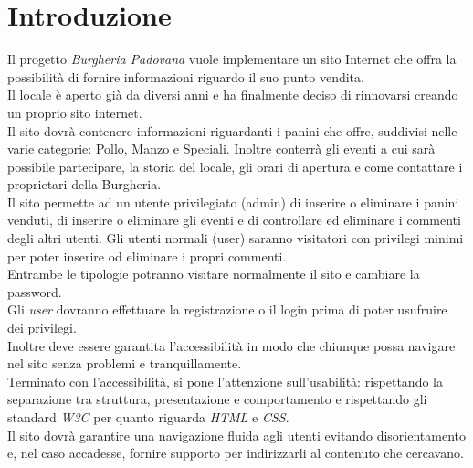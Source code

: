 \section{Introduzione}
Il progetto \emph{Burgheria Padovana} vuole implementare un sito Internet che offra la possibilità di fornire informazioni riguardo il suo punto vendita.\\
Il locale è aperto già da diversi anni e ha finalmente deciso di rinnovarsi creando un proprio sito internet.\\
Il sito dovrà contenere informazioni riguardanti i panini che offre, suddivisi nelle varie categorie: Pollo, Manzo e Speciali. 
Inoltre conterrà gli eventi a cui sarà possibile partecipare, la storia del locale, gli orari di apertura e come contattare i proprietari della Burgheria.\\
Il sito permette ad un utente privilegiato (admin) di inserire o eliminare i panini venduti, di inserire o eliminare gli eventi e di controllare ed eliminare i commenti degli altri utenti. Gli utenti normali (user) saranno visitatori 
con privilegi minimi per poter inserire od eliminare i propri commenti.\\
Entrambe le tipologie potranno visitare normalmente il sito e cambiare la password.\\
Gli \emph{user} dovranno effettuare la registrazione o il login prima di poter usufruire dei privilegi.\\
Inoltre deve essere garantita l'accessibilità in modo che chiunque possa navigare nel sito senza problemi e tranquillamente.\\
Terminato con l'accessibilità, si pone l'attenzione sull'usabilità: rispettando la separazione tra struttura, presentazione e comportamento e rispettando gli standard \emph{W3C} per quanto riguarda \emph{HTML} e \emph{CSS}.\\
Il sito dovrà garantire una navigazione fluida agli utenti evitando disorientamento e, nel caso accadesse, fornire supporto per indirizzarli al contenuto che cercavano.\\